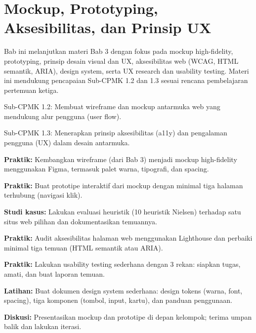\documentclass[../main.tex]{subfiles}
\begin{document}
\chapter{Mockup, Prototyping, Aksesibilitas, dan Prinsip UX}

Bab ini melanjutkan materi Bab 3 dengan fokus pada mockup high-fidelity, prototyping, prinsip desain visual dan UX, aksesibilitas web (WCAG, HTML semantik, ARIA), design system, serta UX research dan usability testing. Materi ini mendukung pencapaian Sub-CPMK 1.2 dan 1.3 sesuai rencana pembelajaran pertemuan ketiga.

\begin{subcpmk}
  \item Sub-CPMK 1.2: Membuat wireframe dan mockup antarmuka web yang mendukung alur pengguna (user flow).
  \item Sub-CPMK 1.3: Menerapkan prinsip aksesibilitas (a11y) dan pengalaman pengguna (UX) dalam desain antarmuka.
\end{subcpmk}









\begin{aktivitas}
  \item \textbf{Praktik:} Kembangkan wireframe (dari Bab 3) menjadi mockup high-fidelity menggunakan Figma, termasuk palet warna, tipografi, dan spacing.
  \item \textbf{Praktik:} Buat prototipe interaktif dari mockup dengan minimal tiga halaman terhubung (navigasi klik).
  \item \textbf{Studi kasus:} Lakukan evaluasi heuristik (10 heuristik Nielsen) terhadap satu situs web pilihan dan dokumentasikan temuannya.
  \item \textbf{Praktik:} Audit aksesibilitas halaman web menggunakan Lighthouse dan perbaiki minimal tiga temuan (HTML semantik atau ARIA).
  \item \textbf{Praktik:} Lakukan usability testing sederhana dengan 3 rekan: siapkan tugas, amati, dan buat laporan temuan.
  \item \textbf{Latihan:} Buat dokumen design system sederhana: design tokens (warna, font, spacing), tiga komponen (tombol, input, kartu), dan panduan penggunaan.
  \item \textbf{Diskusi:} Presentasikan mockup dan prototipe di depan kelompok; terima umpan balik dan lakukan iterasi.
\end{aktivitas}
\end{document}
